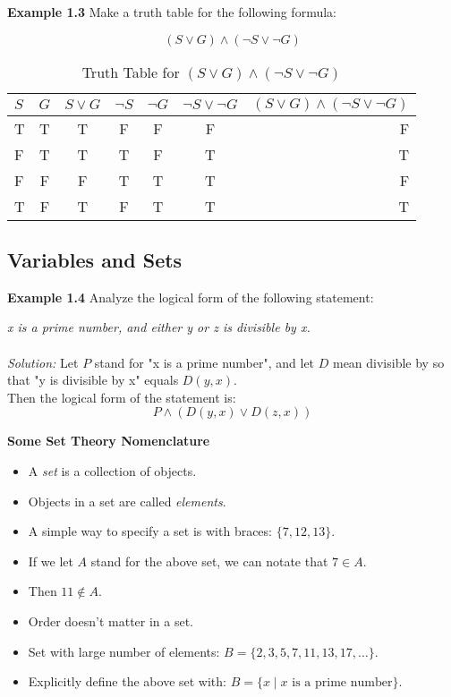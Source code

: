\documentclass[11pt]{article}
\begin{document}
\textbf{Example 1.3} Make a truth table for the following formula:

\[
    (S \vee G) \wedge (\neg S \vee \neg G)
\]

\begin{table}[htbp]
    \caption{Truth Table for \((S \vee G) \wedge (\neg S \vee \neg G)\)}
    \centering
    \begin{tabular}{|l|c|c|c|c|c|r|}
        \hline
        \(S\) & \(G\) & \(S \vee G\) & \(\neg S\) & \(\neg G\) & \(\neg S \vee \neg G\) & \((S \vee G) \wedge (\neg S \vee \neg G)\) \\
        \hline
        T & T & T & F & F & F & F \\
        F & T & T & T & F & T & T \\
        F & F & F & T & T & T & F \\
        T & F & T & F & T & T & T \\
        \hline
    \end{tabular}
\end{table}

\pagebreak

\subsection{Variables and Sets}

\textbf{Example 1.4} Analyze the logical form of the following statement:

\begin{center}
    \textit{x is a prime number, and either y or z is divisible by x.}\\~\\
    \textit{Solution:} Let \( P \) stand for "x is a prime number", and let \( D \) mean divisible by so that "y is divisible by x" equals \( D(y,x) \). \\
    Then the logical form of the statement is: 
    \[
        P \wedge (D(y,x) \vee D(z,x))
    \]
\end{center}

\textbf{Some Set Theory Nomenclature}

\begin{itemize}
    \item A \textit{set} is a collection of objects.
    \item Objects in a set are called \textit{elements}.
    \item A simple way to specify a set is with braces: \(\{7, 12, 13\}\).
    \item If we let \( A \) stand for the above set, we can notate that \( 7 \in A \).
    \item Then \( 11 \notin A \).
    \item Order doesn't matter in a set.
    \item Set with large number of elements: \( B = \{2,3,5,7,11,13,17,\ldots\} \).
    \item Explicitly define the above set with: \( B = \{ x \mid x \text{ is a prime number} \} \).
\end{itemize}
\end{document}
